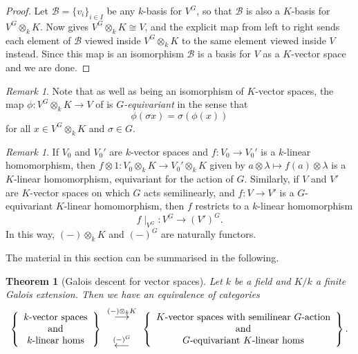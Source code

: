 \documentclass[11pt]{amsart}
\numberwithin{equation}{section}
\newtheorem{theorem}[equation]{Theorem}
\theoremstyle{remark}
\newtheorem{remark}[equation]{Remark}
\theoremstyle{remark}
\theoremstyle{remark}
\theoremstyle{definition}
\theoremstyle{definition}
\theoremstyle{definition}
\theoremstyle{definition}
\theoremstyle{definition}
\theoremstyle{definition}
\begin{document}
\begin{proof}
Let $\mathcal{B}=\{v_i\}_{i\in I}$ be any $k$-basis for $V^G$, so that $\mathcal{B}$ is also a $K$-basis for $V^G\otimes_k K$. Now  gives $V^G\otimes_k K\cong V$, and the explicit map from left to right sends each element of $\mathcal{B}$ viewed inside $V^G\otimes_k K$ to the same element viewed inside $V$ instead. Since this map is an isomorphism $\mathcal{B}$ is a basis for $V$ as a $K$-vector space and we are done.
\end{proof}

\begin{remark} \label{g equivariance}
Note that as well as being an isomorphism of $K$-vector spaces, the map $\phi:V^G\otimes_k K\rightarrow V$ of   is $G$\textit{-equivariant} in the sense that
\[\phi(\sigma x)=\sigma(\phi(x))\]
for all $x\in V^G\otimes_k K$ and $\sigma \in G$.
\end{remark}

\begin{remark}
If $V_0$ and $V_0'$ are $k$-vector spaces and $f:V_0\rightarrow V_0'$ is a $k$-linear homomorphism, then $f\otimes 1:V_0\otimes_k K\rightarrow V_0'\otimes_k K$ given by $a\otimes \lambda \mapsto f(a)\otimes \lambda$ is a $K$-linear homomorphism, equivariant for the action of $G$. Similarly, if $V$ and $V'$ are $K$-vector spaces on which $G$ acts semilinearly, and $f:V\rightarrow V'$ is a $G$-equivariant $K$-linear homomorphism, then $f$ restricts to a $k$-linear homomorphism 
\[f\mid_{V^G}:V^G\rightarrow (V')^G.\]
In this way,  $(-)\otimes_k K$ and $(-)^G$ are naturally functors. 
\end{remark}

The material in this section can be summarised in the following.

\begin{theorem}[Galois descent for vector spaces] \label{galois descent for vector spaces cat}
Let $k$ be a field and $K/k$ a finite Galois extension. Then we have an equivalence of categories
\[\left\{\begin{array}{c}k\textup{-vector spaces}\\ \textup{and}\\ k\textup{-linear homs}\end{array}\right\} \begin{array}{c}\stackrel{(-)\otimes_k K}{\longrightarrow}\\ \\ \stackrel{(-)^G}{\longleftarrow}\end{array} \left\{\begin{array}{c}K\textup{-vector spaces}\textup{ with semilinear }G\textup{-action}\\ \textup{and}\\ G\textup{-equivariant }K\textup{-linear homs}\end{array}\right\}.\]
\end{theorem}
\end{document}
